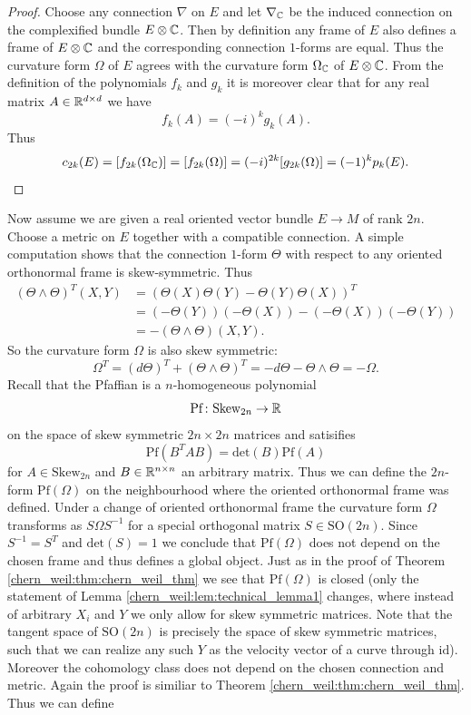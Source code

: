 \begin{proof}
    Choose any connection $\nabla$ on $E$ and let $\nabla_{\mathbb{C}}$ be the induced connection on the complexified bundle $E \otimes \mathbb{C}$. Then by definition any frame of $E$ also defines a frame of $E \otimes \mathbb{C}$ and the corresponding connection $1$-forms are equal. Thus the curvature form $\Omega$ of $E$ agrees with the curvature form $\Omega_{\mathbb{C}}$ of $E \otimes \mathbb{C}$. From the definition of the polynomials $f_k$ and $g_k$ it is moreover clear that for any real matrix $A \in \mathbb{R}^{d \times d}$ we have 
    \[
    f_k(A) = (-i)^k g_k(A).
    \]
    Thus 
    \[
    c_{2k}(E) = [f_{2k}(\Omega_{\mathbb{C}})] = [f_{2k}(\Omega)] = (-i)^{2k} [g_{2k}(\Omega)] = (-1)^k p_k(E).
    \]
\end{proof}

Now assume we are given a real oriented vector bundle $E \to M$ of rank $2n$. Choose a metric on $E$ together with a compatible connection. A simple computation shows that the connection $1$-form $\Theta$ with respect to any oriented orthonormal frame is skew-symmetric. Thus 
\begin{align*}
    (\Theta \wedge \Theta)^T(X,Y) &= (\Theta(X)\Theta(Y) - \Theta(Y)\Theta(X))^T \\ 
    &= (-\Theta(Y))(-\Theta(X)) - (-\Theta(X))(-\Theta(Y)) \\
    &= - (\Theta \wedge \Theta) (X,Y).
\end{align*}
So the curvature form $\Omega$ is also skew symmetric:
\[
\Omega^T = (d\Theta)^T + (\Theta \wedge \Theta)^T = -d\Theta - \Theta \wedge \Theta = -\Omega.
\]
Recall that the Pfaffian is a $n$-homogeneous polynomial 
\[
\mathrm{Pf} \colon \mathrm{Skew}_{2n} \to \mathbb{R}
\]
on the space of skew symmetric $2n \times 2n$ matrices and satisifies 
\[
\mathrm{Pf}(B^T A B) = \mathrm{det}(B)\mathrm{Pf}(A)
\]
for $A \in \mathrm{Skew}_{2n}$ and $B \in \mathbb{R}^{n \times n}$ an arbitrary matrix. Thus we can define the $2n$-form $\mathrm{Pf}(\Omega)$ on the neighbourhood where the oriented orthonormal frame was defined. Under a change of oriented orthonormal frame the curvature form $\Omega$ transforms as $S \Omega S^{-1}$ for a special orthogonal matrix $S \in \mathrm{SO}(2n)$. Since $S^{-1} = S^T$ and $\mathrm{det}(S) = 1$ we conclude that $\mathrm{Pf}(\Omega)$ does not depend on the chosen frame and thus defines a global object. Just as in the proof of Theorem \ref{chern_weil:thm:chern_weil_thm} we see that $\mathrm{Pf}(\Omega)$ is closed (only the statement of Lemma \ref{chern_weil:lem:technical_lemma1} changes, where instead of arbitrary $X_i$ and $Y$ we only allow for skew symmetric matrices. Note that the tangent space of $\mathrm{SO}(2n)$ is precisely the space of skew symmetric matrices, such that we can realize any such $Y$ as the velocity vector of a curve through $\mathrm{id}$). Moreover the cohomology class does not depend on the chosen connection and metric. Again the proof is similiar to Theorem \ref{chern_weil:thm:chern_weil_thm}. Thus we can define 

